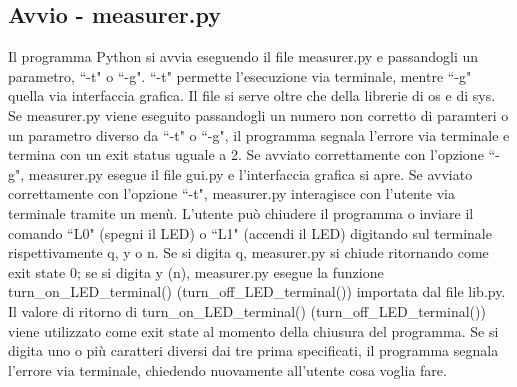 \documentclass[a4paper]{article}
\begin{document}
\subsection{Avvio - measurer.py}
Il programma Python si avvia eseguendo il file measurer.py e passandogli un parametro, ``-t" o ``-g". ``-t" permette l'esecuzione via terminale, mentre ``-g" quella via interfaccia grafica. Il file si serve oltre che della librerie di os e di sys.
\newline 
Se measurer.py viene eseguito passandogli un numero non corretto di paramteri o un parametro diverso da ``-t" o ``-g", il programma segnala l'errore via terminale e termina con un exit status uguale a 2. Se avviato correttamente con l'opzione ``-g", measurer.py esegue il file gui.py e l'interfaccia grafica si apre.
\newline
Se avviato correttamente con l'opzione ``-t", measurer.py interagisce con l'utente via terminale tramite un men\`{u}. L'utente pu\`{o} chiudere il programma o inviare il comando ``L0" (spegni il LED) o ``L1" (accendi il LED) digitando sul terminale rispettivamente q, y o n. Se si digita q, measurer.py si chiude ritornando come exit state 0; se si digita y (n), measurer.py esegue la funzione turn\_on\_LED\_terminal() (turn\_off\_LED\_terminal()) importata dal file lib.py.  Il valore di ritorno di turn\_on\_LED\_terminal() (turn\_off\_LED\_terminal()) viene utilizzato come exit state al momento della chiusura del programma. Se si digita uno o pi\`{u} caratteri diversi dai tre prima specificati, il programma segnala l'errore via terminale, chiedendo nuovamente all'utente cosa voglia fare.
\end{document}

